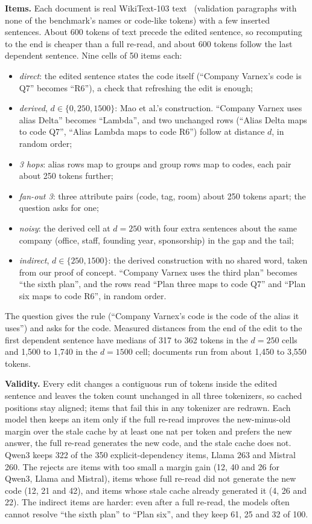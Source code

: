 \documentclass[conference]{IEEEtran}
\begin{document}
\textbf{Items.} Each document is real WikiText-103 text~\cite{merity2017wikitext} (validation paragraphs with
none of the benchmark's names or code-like tokens) with a few inserted sentences. About 600 tokens of text
precede the edited sentence, so recomputing to the end is cheaper than a full re-read, and about 600 tokens
follow the last dependent sentence. Nine cells of 50 items each:
\begin{itemize}
\item \emph{direct}: the edited sentence states the code itself (``Company Varnex's code is Q7'' becomes
``R6''), a check that refreshing the edit is enough;
\item \emph{derived}, $d \in \{0, 250, 1500\}$: Mao et al.'s construction. ``Company Varnex uses alias Delta''
becomes ``Lambda'', and two unchanged rows (``Alias Delta maps to code Q7'', ``Alias Lambda maps to code R6'')
follow at distance $d$, in random order;
\item \emph{3 hops}: alias rows map to groups and group rows map to codes, each pair about 250 tokens further;
\item \emph{fan-out 3}: three attribute pairs (code, tag, room) about 250 tokens apart; the question asks for one;
\item \emph{noisy}: the derived cell at $d=250$ with four extra sentences about the same company (office, staff,
founding year, sponsorship) in the gap and the tail;
\item \emph{indirect}, $d \in \{250, 1500\}$: the derived construction with no shared word, taken from our proof
of concept. ``Company Varnex uses the third plan'' becomes ``the sixth plan'', and the rows read ``Plan three
maps to code Q7'' and ``Plan six maps to code R6'', in random order.
\end{itemize}
The question gives the rule (``Company Varnex's code is the code of the alias it uses'') and asks for the code.
Measured distances from the end of the edit to the first dependent sentence have medians of 317 to 362 tokens
in the $d=250$ cells and 1,500 to 1,740 in the $d=1500$ cell; documents run from about 1,450 to 3,550 tokens.

\textbf{Validity.} Every edit changes a contiguous run of tokens inside the edited sentence and leaves the
token count unchanged in all three tokenizers, so cached positions stay aligned; items that fail this in any
tokenizer are redrawn. Each model then keeps an item only if the full re-read improves the new-minus-old
margin over the stale cache by at least one nat per token and prefers the new answer, the full re-read
generates the new code, and the stale cache does not. Qwen3 keeps 322 of the 350 explicit-dependency items,
Llama 263 and Mistral 260. The rejects are items with too small a margin gain (12, 40 and 26 for Qwen3, Llama and
Mistral), items whose full re-read did not generate the new code (12, 21 and 42), and items whose stale cache
already generated it (4, 26 and 22). The indirect items are harder: even
after a full re-read, the models often cannot resolve ``the sixth plan'' to ``Plan six'', and they keep 61, 25
and 32 of 100.
\end{document}

